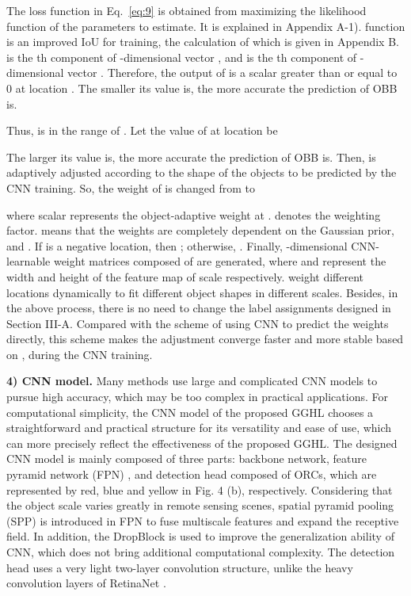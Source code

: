 The loss function in Eq.~\ref{eq:9} is obtained from maximizing the likelihood function of the parameters to estimate. It is explained in Appendix A-1).  function \cite{rezatofighiGeneralizedIntersectionUnion2019} is an improved IoU for training, the calculation of which is given in Appendix B.  is the th component of -dimensional vector , and  is the th component of -dimensional vector . Therefore, the output of  is a scalar greater than or equal to 0 at location . The smaller its value is, the more accurate the prediction of OBB is.

Thus,  is in the range of . Let the value of  at location  be

The larger its value is, the more accurate the prediction of OBB is. Then,  is adaptively adjusted according to the shape of the objects to be predicted by the CNN training. So, the weight of  is changed from  to 

where scalar  represents the object-adaptive weight at .  denotes the weighting factor.  means that the weights are completely dependent on the Gaussian prior, and . If  is a negative location, then ; otherwise, . Finally, -dimensional CNN-learnable weight matrices  composed of  are generated, where  and  represent the width and height of the feature map of scale   respectively.  weight different locations dynamically to fit different object shapes in different scales. Besides, in the above process, there is no need to change the label assignments designed in Section III-A. Compared with the scheme of using CNN to predict the weights directly, this scheme makes the adjustment converge faster and more stable based on , during the CNN training.  

\textbf{4) CNN model.} Many methods use large and complicated CNN models to pursue high accuracy, which may be too complex in practical applications. For computational simplicity, the CNN model of the proposed GGHL chooses a straightforward and practical structure for its versatility and ease of use, which can more precisely reflect the effectiveness of the proposed GGHL. The designed CNN model is mainly composed of three parts: backbone network, feature pyramid network (FPN) \cite{linFeaturePyramidNetworks2017a}, and detection head composed of ORCs, which are represented by red, blue and yellow in Fig. 4 (b), respectively. Considering that the object scale varies greatly in remote sensing scenes, spatial pyramid pooling (SPP) \cite{huang2020dc} is introduced in FPN to fuse multiscale features and expand the receptive field. In addition, the DropBlock \cite{ghiasi2018dropblock} is used to improve the generalization ability of CNN, which does not bring additional computational complexity. The detection head uses a very light two-layer convolution structure, unlike the heavy convolution layers of RetinaNet \cite{linFocalLossDense2017}.

